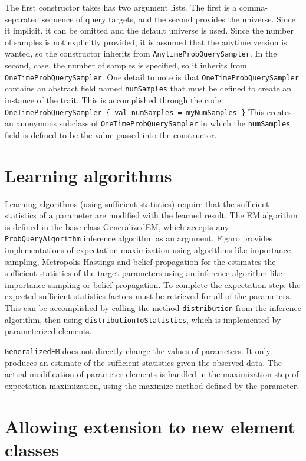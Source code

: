 The first constructor takes has two argument lists. The first is a comma-separated sequence of query targets, and the second provides the universe. Since it implicit, it can be omitted and the default universe is used. Since the number of samples is not explicitly provided, it is assumed that the anytime version is wanted, so the constructor inherits from \texttt{AnytimeProbQuerySampler}. In the second, case, the number of samples is specified, so it inherits from \texttt{OneTimeProbQuerySampler}. One detail to note is that \texttt{OneTimeProbQuerySampler} contains an abstract field named \texttt{numSamples} that must be defined to create an instance of the trait. This is accomplished through the code:
\newline \texttt{OneTimeProbQuerySampler \{ val numSamples = myNumSamples \}}
This creates an anonymous subclass of \texttt{OneTimeProbQuerySampler} in which the \texttt{numSamples} field is defined to be the value passed into the constructor.

\section{Learning algorithms}

Learning algorithms (using sufficient statistics) require that the sufficient statistics of a parameter are modified with the learned result. The EM algorithm is defined in the base class GeneralizedEM, which accepts any \texttt{ProbQueryAlgorithm} inference algorithm as an argument. Figaro provides implementations of expectation maximization using algorithms like importance sampling, Metropolis-Hastings and belief propagation for the estimates the sufficient statistics of the target parameters using an inference algorithm like importance sampling or belief propagation. To complete the expectation step, the expected sufficient statistics factors must be retrieved for all of the parameters. This can be accomplished by calling the method \texttt{distribution} from the inference algorithm, then using \texttt{distributionToStatistics}, which is implemented by parameterized elements.

\texttt{GeneralizedEM} does not directly change the values of parameters. It only produces an estimate of the sufficient statistics given the observed data. The actual modification of parameter elements is handled in the maximization step of expectation maximization, using the maximize method defined by the parameter. 

\section{Allowing extension to new element classes}

